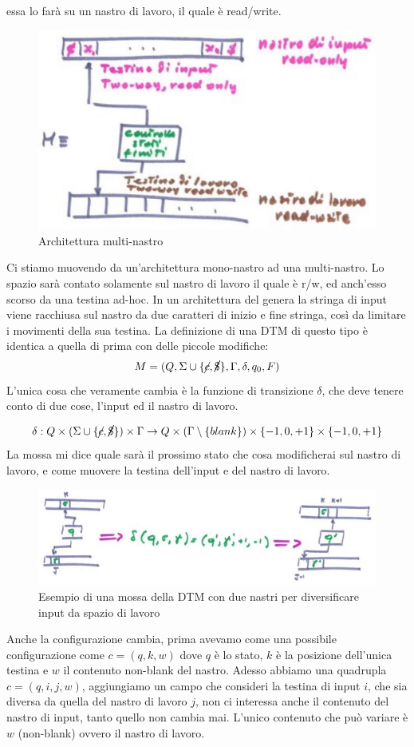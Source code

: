 \documentclass{article}
\begin{document}
essa lo farà su un nastro di lavoro, il quale è read/write.
\begin{figure}[H]
    \centering
    \includegraphics[scale=0.6]{images/nastri_sep_input.png}
    \caption{Architettura multi-nastro}
\end{figure}
Ci stiamo muovendo da un'architettura mono-nastro ad una multi-nastro. Lo spazio sarà contato
solamente sul nastro di lavoro il quale è r/w, ed anch'esso scorso da una testina ad-hoc. In
un architettura del genera la stringa di input viene racchiusa sul nastro da due caratteri
di inizio e fine stringa, così da limitare i movimenti della sua testina.
La definizione di una DTM di questo tipo è identica a quella di prima con delle piccole modifiche:
$$M=(Q,\Sigma\cup\{\cancel{c},\cancel{\$} \},\Gamma,\delta,q_0,F)$$
L'unica cosa che veramente cambia è la funzione di transizione $\delta$, che deve tenere
conto di due cose, l'input ed il nastro di lavoro.

$$\delta:Q\times(\Sigma\cup\{\cancel{c},\cancel{\$} \})\times\Gamma\rightarrow Q\times(\Gamma\setminus\{blank\})\times\{-1,0,+1\}\times \{-1,0,+1\}$$
La mossa mi dice quale sarà il prossimo stato che cosa modificherai sul nastro di lavoro, e
come muovere la testina dell'input e del nastro di lavoro.
\begin{figure}[H]
    \centering
    \includegraphics[scale=0.5]{images/DTM_input_transition.png}
    \caption{Esempio di una mossa della DTM con due nastri per diversificare input da
    spazio di lavoro}
\end{figure}
Anche la configurazione cambia, prima avevamo come una possibile configurazione come
$c=(q,k,w)$ dove $q$ è lo stato, $k$ è la posizione dell'unica testina e $w$ il contenuto non-blank
del nastro. Adesso abbiamo una quadrupla $c=(q,i,j,w)$, aggiungiamo un campo che consideri
la testina di input $i$, che sia diversa
da quella del nastro di lavoro $j$, non ci interessa anche il contenuto del
nastro di input, tanto quello non cambia mai. L'unico contenuto che può variare è $w$ (non-blank)
ovvero il nastro di lavoro.
\end{document}
